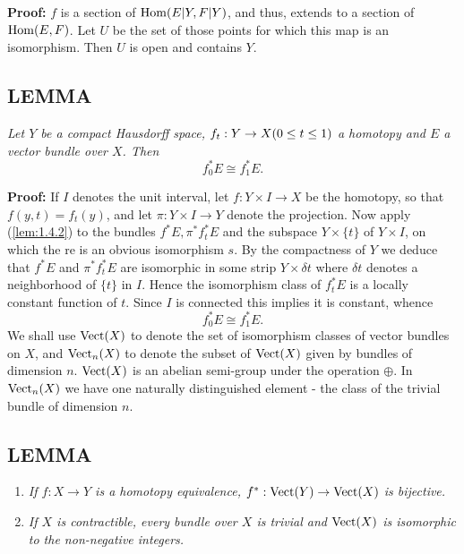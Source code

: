 \textbf{Proof:} $f$ is a section of $\operatorname{Hom}(E \vert Y, F \vert Y)$, and thus, extends to a section of $\operatorname{Hom}(E, F)$. Let $U$ be the set of those points for which this map is an isomorphism. Then $U$ is open and contains $Y$.

\subsection{LEMMA}\label{lem:1.4.3} \textit{Let $Y$ be a compact Hausdorff space, $f_t: Y \to X \\ (0 \leq t \leq 1)$ a homotopy and $E$ a vector bundle over $X$. Then}
\begin{equation*}
    f_0^*E \cong f_1^*E.
\end{equation*}

\textbf{Proof:} If $I$ denotes the unit interval, let $f: Y \times I \to X$ be the homotopy, so that $f(y, t) = f_t(y)$, and let $\pi: Y \times I \to Y$ denote the projection. Now apply (\ref{lem:1.4.2}) to the bundles $f^*E, \pi^* f_t^* E$ and the subspace $Y \times \{t\}$ of $Y \times I$, on which the re is an obvious isomorphism $s$. By the compactness of $Y$ we deduce that $f^*E$ and $\pi^* f_t^* E$ are isomorphic in some strip $Y \times \delta t$ where $\delta t$ denotes a neighborhood of $\{t\}$ in $I$. Hence the isomorphism class of $f_t^*E$ is a locally constant function of $t$. Since $I$ is connected this implies it is constant, whence
\begin{equation*}
f_0^*E \cong f_1^*E.
\end{equation*}
We shall use $\operatorname{Vect}(X)$ to denote the set of isomorphism classes of vector bundles on $X$, and $\operatorname{Vect}_n(X)$ to denote the subset of $\operatorname{Vect}(X)$ given by bundles of dimension $n$. $\operatorname{Vect}(X)$ is an abelian semi-group under the operation $\oplus$. In $\operatorname{Vect}_n(X)$ we have one naturally distinguished element - the class of the trivial bundle of dimension $n$.

\subsection{LEMMA}\label{lem:1.4.4}
\begin{enumerate}[(1)]
    \item \textit{If $f: X \to Y$ is a homotopy equivalence, $f^*: \operatorname{Vect}(Y) \to \operatorname{Vect}(X)$ is bijective.}
    \item \textit{If $X$ is contractible, every bundle over $X$ is trivial and $\operatorname{Vect}(X)$ is isomorphic to the non-negative integers.}
\end{enumerate}

